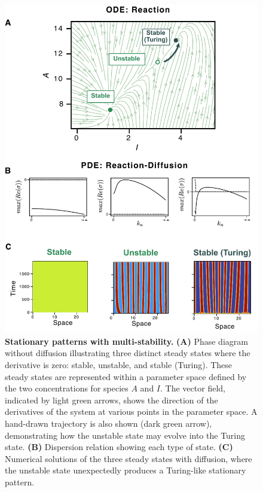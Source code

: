 \documentclass[10pt,letterpaper]{article}
\begin{document}
\begin{figure}[bp!]
    \includegraphics[width=1\textwidth]{figures/multistability1}

    \caption{\textbf{Stationary patterns with multi-stability.} \textbf{(A)} Phase diagram without diffusion illustrating three distinct steady states where the derivative is zero: stable, unstable, and stable (Turing). These steady states are represented within a parameter space defined by the two concentrations for species $A$ and $I$. The vector field, indicated by light green arrows, shows the direction of the derivatives of the system at various points in the parameter space. A hand-drawn trajectory is also shown (dark green arrow), demonstrating how the unstable state may evolve into the Turing state. \textbf{(B)} Dispersion relation showing each type of state. \textbf{(C)} Numerical solutions of the three steady states with diffusion, where the unstable state unexpectedly produces a Turing-like stationary pattern. }
    \label{fig:multistability1}
\end{figure}
\end{document}
